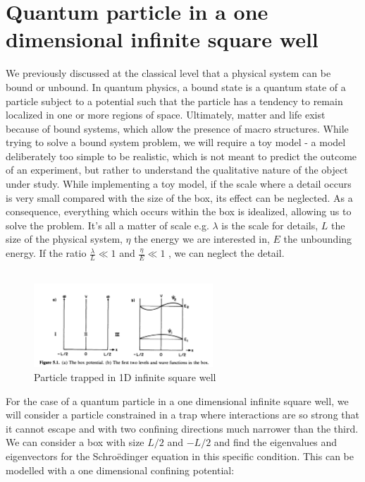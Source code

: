 \section{Quantum particle in a one dimensional infinite square well}
We previously discussed at the classical level that a physical system can be bound or unbound. In quantum physics, a bound state is a quantum state of a particle subject to a potential such that the particle has a tendency to remain localized in one or more regions of space. Ultimately, matter and life exist because of bound systems, which allow the presence of macro structures.
While trying to solve a bound system problem, we will require a toy model - a model deliberately too simple to be realistic, which is not meant to predict the outcome of an experiment, but rather to understand the qualitative nature of the object under study.
While implementing a toy model, if the scale where a detail occurs is very small compared with the size of the box, its effect can be neglected. As a consequence, everything which occurs within the box is idealized, allowing us to solve the problem. It's all a matter of scale e.g. $\lambda$ is the scale for details, $L$ the size of the physical system, $\eta$ the energy we are interested in, $E$ the unbounding energy. If the ratio $\frac{\lambda}{L}\ll1$ and $\frac{\eta}{E}\ll1$ , we can neglect the detail.\\
\\
\begin{figure}[h!]
    \centering
    \includegraphics[clip, width=0.6\textwidth]{1D_well.png}
    \caption{\label{fig:1D_well} Particle trapped in 1D infinite square well}
\end{figure}
\noindent
For the case of a quantum particle in a one dimensional infinite square well, we will consider a particle constrained in a trap where interactions are so strong that it cannot escape and with two confining directions much narrower than the third. We can consider a box with size $L/2$ and $-L/2$ and find the eigenvalues and eigenvectors for the Schro\"edinger equation in this specific condition.
This can be modelled with a one dimensional confining potential:

